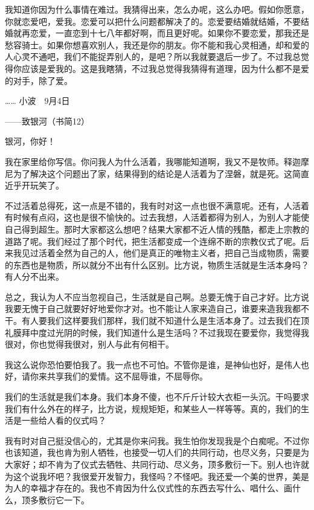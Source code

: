 我知道你因为什么事情在难过。我猜得出来，怎么办呢，这么办吧。假如你愿意，你就恋爱吧，爱我。恋爱可以把什么问题都解决了的。恋爱要结婚就结婚，不要结婚就再恋爱，一直恋到十七八年都好啊，而且更好呢。如果你不要恋爱，那我还是愁容骑士。如果你想喜欢别人，我还是你的朋友。你不能和我心灵相通，却和爱的人心灵不通吧，我们不能捉弄别人的，是吧？所以我就要退后一步了。不过我总觉得你应该是爱我的。这是我瞎猜，不过我总觉得我猜得有道理，因为什么都不是爱的对手，除了爱。 

…… 小波　9月4日　 







——致银河（书简12） 

银河，你好！ 

我在家里给你写信。你问我人为什么活着，我哪能知道啊，我又不是牧师。释迦摩尼为了解决这个问题出了家，结果得到的结论是人活着为了涅磐，就是死。这简直近乎开玩笑了。 

不过活着总得死，这一点是不错的，我有时对这一点也很不满意呢。还有，人活着有时候有点闷，这也是很不愉快的。过去我想，人活着都得为别人，为别人才能使自己得到超生。那时大家都这么想吧？结果大家都不近人情的残酷，都走上宗教的道路了呢。我们经过了那个时代，把生活都变成一个连绵不断的宗教仪式了呢。后来我见过活着全然为自己的人，他们是真正的唯物主义者，把自己当成物质，需要的东西也是物质，所以就分不出有什么区别。比方说，物质生活就是生活本身吗？有人分不出来。 

总之，我认为人不应当忽视自己，生活就是自己啊。总要无愧于自己才好。比方说我要无愧于自己就要好好地爱你才对。也不能让人家来造自己，谁要来造我我都不干。有人要我们这样要我们那样，我们就不知道什么是生活本身了。过去我们在顶礼膜拜中度过光阴的时候，我们知道什么是生活吗？不过我现在要爱你，我觉得我很对，你也觉得我很对，别人与此有何相干。 

我这么说你恐怕要怕我了。我一点也不可怕。不管你是谁，是神仙也好，是伟人也好，请你来共享我们的爱情。这不屈辱谁，不屈辱你。 

我们的生活就是我们本身。我们本身不傻，也不斤斤计较大衣柜一头沉。干吗要求我们有什么外在的样子，比方说，规规矩矩，和某些人一样等等。真的，我们的生活是一些给人看的仪式吗？ 

我有时对自己挺没信心的，尤其是你来问我。我生怕你发现我是个白痴呢。不过你也该知道，我也肯为别人牺牲，也接受一切人们的共同行动，也尽义务，只要是为大家好；却不肯为了仪式去牺牲、共同行动、尽义务，顶多敷衍一下。别人也许就为这个说我坏吧？我很爱开发智力，我怪吗？不怪吧。我还爱一个美的世界，美是为人的幸福才存在的。我也不肯因为什么仪式性的东西去写什么、唱什么、画什么，顶多敷衍它一下。 

